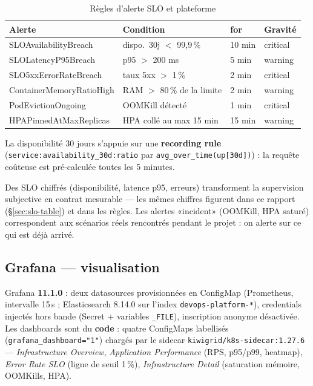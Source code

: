 \documentclass[11pt,a4paper]{article}
\begin{document}
\begin{table}[h!]
\centering\small
\begin{tabular}{@{}llll@{}}
\toprule
\textbf{Alerte} & \textbf{Condition} & \textbf{for} & \textbf{Gravité} \\
\midrule
SLOAvailabilityBreach & dispo.\ 30j $<$ 99{,}9\,\% & 10 min & critical \\
SLOLatencyP95Breach & p95 $>$ 200 ms & 5 min & warning \\
SLO5xxErrorRateBreach & taux 5xx $>$ 1\,\% & 2 min & critical \\
ContainerMemoryRatioHigh & RAM $>$ 80\,\% de la limite & 2 min & warning \\
PodEvictionOngoing & OOMKill détecté & 1 min & critical \\
HPAPinnedAtMaxReplicas & HPA collé au max 15 min & 15 min & warning \\
\bottomrule
\end{tabular}
\caption{Règles d'alerte SLO et plateforme}
\end{table}

La disponibilité 30 jours s'appuie sur une \textbf{recording rule} (\texttt{service:availability\_30d:ratio} par \texttt{avg\_over\_time(up[30d])}) : la requête coûteuse est pré-calculée toutes les 5 minutes.

\begin{whybox}
Des SLO chiffrés (disponibilité, latence p95, erreurs) transforment la supervision subjective en contrat mesurable --- les mêmes chiffres figurent dans ce rapport (\S\ref{sec:slo-table}) et dans les règles. Les alertes «incident» (OOMKill, HPA saturé) correspondent aux scénarios réels rencontrés pendant le projet : on alerte sur ce qui est déjà arrivé.
\end{whybox}

\subsection{Grafana --- visualisation}
Grafana \textbf{11.1.0} : deux datasources provisionnées en ConfigMap (Prometheus, intervalle 15\,s ; Elasticsearch 8.14.0 sur l'index \texttt{devops-platform-*}), credentials injectés hors bande (Secret + variables \texttt{\_FILE}), inscription anonyme désactivée. Les dashboards sont du \textbf{code} : quatre ConfigMaps labellisés (\texttt{grafana\_dashboard="1"}) chargés par le sidecar \texttt{kiwigrid/k8s-sidecar:1.27.6} --- \emph{Infrastructure Overview}, \emph{Application Performance} (RPS, p95/p99, heatmap), \emph{Error Rate SLO} (ligne de seuil 1\,\%), \emph{Infrastructure Detail} (saturation mémoire, OOMKills, HPA).
\end{document}
